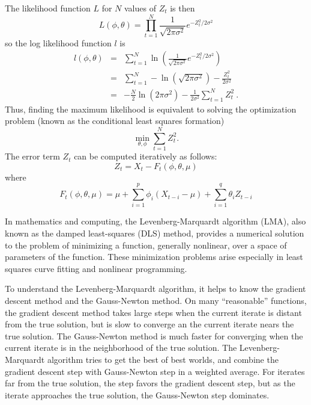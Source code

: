 \documentclass[english,10pt]{llncs}
\begin{document}
The likelihood function $L$ for $N$ values of $Z_t$  is then
\begin{equation}
L(\phi, \theta) = \prod_{t = 1}^N  \frac{1}{\sqrt{2 \pi \sigma^2}} e^{-Z^2_t/2 \sigma^2}
\end{equation}
so the log likelihood function $l$ is
\begin{eqnarray}
  l(\phi, \theta) &=& \sum_{t = 1}^N \ln \left(\frac{1}{\sqrt{2 \pi \sigma^2}}
    e^{-Z^2_t/2 \sigma^2}
  \right) \nonumber\\
  &=&  \sum_{t = 1}^N  - \ln \left( \sqrt{2 \pi \sigma^2}\right)
  -\frac{Z^2_t}{2 \sigma^2}\nonumber\\
  &=&  -\frac{N}{2} \ln \left( 2 \pi \sigma^2\right)  - \frac{1}{2
    \sigma^2} \sum_{t = 1}^N   Z^2_t\ . \label{eq:loglikelihood}
\end{eqnarray}
Thus, finding the maximum likelihood is equivalent to solving the
optimization problem (known as the conditional least squares
formation)
\begin{equation}
\min_{\theta, \phi} \sum_{t = 1}^N  Z^2_t.
\end{equation}
The error term $Z_t$ can be computed iteratively as follows:
\begin{equation}
    Z_t = X_t - F_t(\phi, \theta, \mu) \label{eq:error-terms}
\end{equation}
where
\begin{equation}
F_t(\phi, \theta, \mu) = \mu + \sum_{i=1}^p \phi_i (X_{t-i}-\mu) + \sum_{i=1}^q
\theta_i Z_{t-i}
\end{equation}

In mathematics and computing, the Levenberg-Marquardt algorithm (LMA),
also known as the damped least-squares (DLS) method, provides a
numerical solution to the problem of minimizing a function, generally
nonlinear, over a space of parameters of the function. These
minimization problems arise especially in least squares curve fitting
and nonlinear programming.

To understand the Levenberg-Marquardt algorithm, it helps to know the
gradient descent method and the Gauss-Newton method.  On many
``reasonable'' functions, the gradient descent method takes large
steps when the current iterate is distant from the true solution, but
is slow to converge an the current iterate nears the true solution.
The Gauss-Newton method is much faster for converging when the current
iterate is in the neighborhood of the true solution.  The
Levenberg-Marquardt algorithm tries to get the best of best worlds,
and combine the gradient descent step with Gauss-Newton step in a
weighted average.  For iterates far from the true solution, the step
favors the gradient descent step, but as the iterate approaches the
true solution, the Gauss-Newton step dominates.
\end{document}
